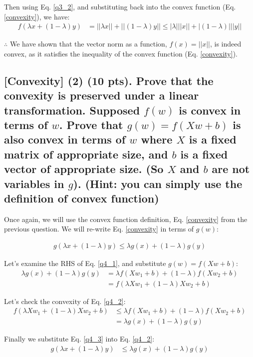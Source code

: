 Then using Eq. \ref{q3_2}, and substituting back into the convex function (Eq. \ref{convexity}), we have:
\begin{align}
    f(\lambda x + (1-\lambda)y) &= ||\lambda x || + ||(1-\lambda) y|| \leq |\lambda | ||x|| + |(1-\lambda)| ||y|| \label{q3_3}
\end{align}

$\therefore$ We have shown that the vector norm as a function, $f(x) = ||x||$, is indeed convex, as it satisfies the inequality of the convex function (Eq. \ref{convexity}).

\subsection{[Convexity] (2) (10 pts). Prove that the convexity is preserved under a linear transformation. Supposed $f(w)$ is convex in terms of $w$. Prove that $g(w)=f(X w + b)$ is also convex in terms of $w$ where $X$ is a fixed matrix of appropriate size, and $b$ is a fixed vector of appropriate size. (So $X$ and $b$ are not variables in $g$). (Hint: you can simply use the definition of convex function)}

Once again, we will use the convex function definition, Eq. \ref{convexity} from the previous question. We will re-write Eq. \ref{convexity} in terms of $g(w)$:

\begin{align}
    g(\lambda x + (1-\lambda)y) \leq \lambda g(x) + (1-\lambda) g(y) \label{q4_1}
\end{align}

Let's examine the RHS of Eq. \ref{q4_1}, and substitute $g(w) = f(Xw+b)$:
\begin{align}
    \lambda g(x) + (1-\lambda) g(y) &= \lambda f(Xw_1+b) + (1-\lambda) f(Xw_2+b) \label{q4_2} \nonumber \\
    &= f(\lambda X w_1 + (1-\lambda) X w_2 + b)
\end{align}

Let's check the convexity of Eq. \ref{q4_2}:
\begin{align}
    f(\lambda X w_1 + (1-\lambda) X w_2 + b) &\leq \lambda f(X w_1 +b) + (1-\lambda) f(X w_2 + b) \label{q4_3} \nonumber \\
    &= \lambda g(x) + (1-\lambda) g(y)
\end{align}

Finally we substitute Eq. \ref{q4_3} into Eq. \ref{q4_2}:
\begin{align}
    g(\lambda x + (1-\lambda)y) &\leq \lambda g(x) + (1-\lambda) g(y) \label{q4_4}
\end{align}

